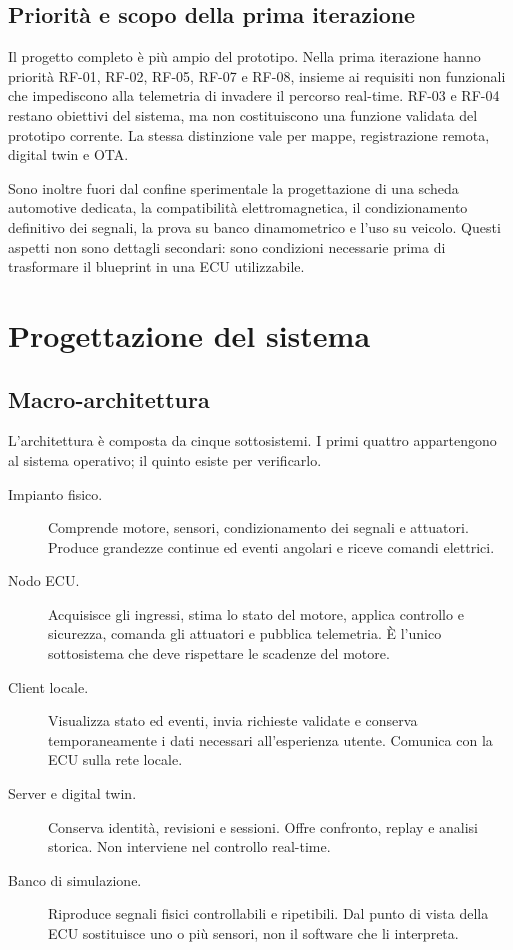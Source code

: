 \documentclass{article}
\begin{document}
\subsection{Priorità e scopo della prima iterazione}

Il progetto completo è più ampio del prototipo. Nella prima iterazione hanno
priorità RF-01, RF-02, RF-05, RF-07 e RF-08, insieme ai requisiti non funzionali
che impediscono alla telemetria di invadere il percorso real-time. RF-03 e RF-04
restano obiettivi del sistema, ma non costituiscono una funzione validata del
prototipo corrente. La stessa distinzione vale per mappe, registrazione remota,
digital twin e OTA.

Sono inoltre fuori dal confine sperimentale la progettazione di una scheda
automotive dedicata, la compatibilità elettromagnetica, il condizionamento
definitivo dei segnali, la prova su banco dinamometrico e l'uso su veicolo.
Questi aspetti non sono dettagli secondari: sono condizioni necessarie prima di
trasformare il blueprint in una ECU utilizzabile.

\section{Progettazione del sistema}
\label{sec:progettazione}

\subsection{Macro-architettura}

L'architettura è composta da cinque sottosistemi. I primi quattro appartengono
al sistema operativo; il quinto esiste per verificarlo.

\begin{description}
    \item[Impianto fisico.] Comprende motore, sensori, condizionamento dei
          segnali e attuatori. Produce grandezze continue ed eventi angolari e
          riceve comandi elettrici.

    \item[Nodo ECU.] Acquisisce gli ingressi, stima lo stato del motore, applica
          controllo e sicurezza, comanda gli attuatori e pubblica telemetria. È
          l'unico sottosistema che deve rispettare le scadenze del motore.

    \item[Client locale.] Visualizza stato ed eventi, invia richieste validate
          e conserva temporaneamente i dati necessari all'esperienza utente.
          Comunica con la ECU sulla rete locale.

    \item[Server e digital twin.] Conserva identità, revisioni e sessioni. Offre
          confronto, replay e analisi storica. Non interviene nel controllo
          real-time.

    \item[Banco di simulazione.] Riproduce segnali fisici controllabili e
          ripetibili. Dal punto di vista della ECU sostituisce uno o più sensori,
          non il software che li interpreta.
\end{description}
\end{document}
